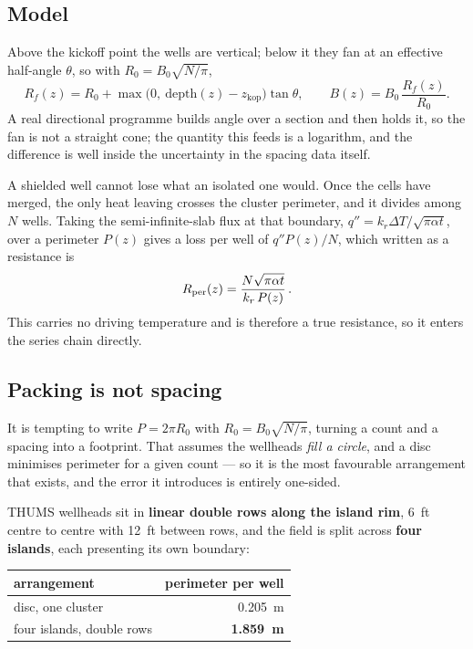 \subsection{Model}

Above the kickoff point the wells are vertical; below it they fan at an
effective half-angle $\theta$, so with
$R_0 = B_0\sqrt{N/\pi}$,
\begin{equation}
R_f(z) = R_0 + \max\!\big(0,\ \text{depth}(z) - z_{\mathrm{kop}}\big)\tan\theta,
\qquad
B(z) = B_0\,\frac{R_f(z)}{R_0}.
\end{equation}
A real directional programme builds angle over a section and then holds it, so
the fan is not a straight cone; the quantity this feeds is a logarithm, and
the difference is well inside the uncertainty in the spacing data itself.

A shielded well cannot lose what an isolated one would. Once the cells have
merged, the only heat leaving crosses the cluster perimeter, and it divides
among $N$ wells. Taking the semi-infinite-slab flux at that boundary,
$q'' = k_r \Delta T/\sqrt{\pi\alpha t}$, over a perimeter $P(z)$ gives a loss
per well of $q''P(z)/N$, which written as a resistance is
\begin{equation}
R_{\mathrm{per}}(z) = \frac{N\sqrt{\pi\alpha t}}{k_r\,P(z)}\,.
\label{eq:Rper}
\end{equation}
This carries no driving temperature and is therefore a true resistance, so it
enters the series chain directly.

\subsection{Packing is not spacing}
\label{sec:packing-field}

It is tempting to write $P = 2\pi R_0$ with $R_0 = B_0\sqrt{N/\pi}$, turning a
count and a spacing into a footprint. That assumes the wellheads \emph{fill a
circle}, and a disc minimises perimeter for a given count --- so it is the
most favourable arrangement that exists, and the error it introduces is
entirely one-sided.

THUMS wellheads sit in \textbf{linear double rows along the island rim},
\SI{6}{ft} centre to centre with \SI{12}{ft} between rows, and the field is
split across \textbf{four islands}, each presenting its own boundary:

\begin{center}
\begin{tabular}{lr}
\toprule
arrangement & perimeter per well \\
\midrule
disc, one cluster & \SI{0.205}{\metre} \\
four islands, double rows & \textbf{\SI{1.859}{\metre}} \\
\bottomrule
\end{tabular}
\end{center}

